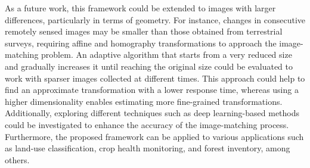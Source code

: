 As a future work, this framework could be extended to images with larger differences, particularly in terms of geometry. For instance, changes in consecutive remotely sensed images may be smaller than those obtained from terrestrial surveys, requiring affine and homography transformations to approach the image-matching problem. An adaptive algorithm that starts from a very reduced size and gradually increases it until reaching the original size could be evaluated to work with sparser images collected at different times. This approach could help to find an approximate transformation with a lower response time, whereas using a higher dimensionality enables estimating more fine-grained transformations. Additionally, exploring different techniques such as deep learning-based methods could be investigated to enhance the accuracy of the image-matching process. Furthermore, the proposed framework can be applied to various applications such as land-use classification, crop health monitoring, and forest inventory, among others.


